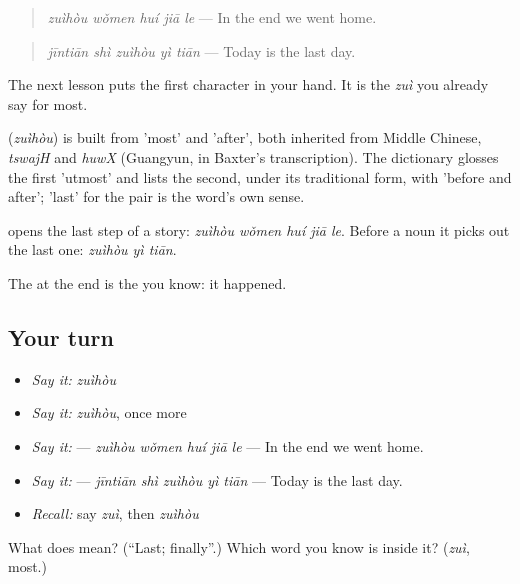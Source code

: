 \begin{quote}
\textbf{} \emph{zuìhòu wǒmen huí jiā le} — In the end we went home.
\end{quote}

\begin{quote}
\textbf{} \emph{jīntiān shì zuìhòu yì tiān} — Today is the last day.
\end{quote}

The next lesson puts the first character in your hand. It is the \emph{zuì} you already say for most.

\begin{cousinweb}
\textbf{} (\emph{zuìhòu}) is built from  'most' and  'after', both inherited from Middle Chinese, \emph{tswajH} and \emph{huwX} (Guangyun, in Baxter's transcription). The dictionary glosses the first 'utmost' and lists the second, under its traditional form, with 'before and after'; 'last' for the pair is the word's own sense.
\end{cousinweb}

\begin{grammarlens}[title={What you've built}]
 opens the last step of a story: \textbf{} \emph{zuìhòu wǒmen huí jiā le}. Before a noun it picks out the last one: \textbf{} \emph{zuìhòu yì tiān}.

The  at the end is the  you know: it happened.
\end{grammarlens}

\subsection*{Your turn}
\begin{itemize}
\raggedright
  \item \emph{Say it:} \emph{zuìhòu}
  \item \emph{Say it:} \emph{zuìhòu}, once more
  \item \emph{Say it:}  — \emph{zuìhòu wǒmen huí jiā le} — In the end we went home.
  \item \emph{Say it:}  — \emph{jīntiān shì zuìhòu yì tiān} — Today is the last day.
  \item \emph{Recall:} say \emph{zuì}, then \emph{zuìhòu}
\end{itemize}

\begin{tcolorbox}[breakable,colback=teal!4,colframe=teal!35!black,title={Before you move on}]
What does  mean? (\textquotedblleft{}Last; finally\textquotedblright{}.) Which word you know is inside it? (\emph{zuì}, most.)
\end{tcolorbox}
